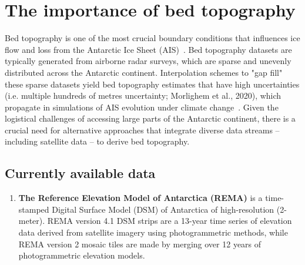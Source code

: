 

\section*{The importance of bed topography}
Bed topography is one of the most crucial boundary conditions that influences ice flow and loss from the Antarctic Ice Sheet (AIS)~\cite{Morlighem_2020}. Bed topography datasets are typically generated from airborne radar surveys, which are sparse and unevenly distributed across the Antarctic continent. Interpolation schemes to "gap fill" these sparse datasets yield bed topography estimates that have high uncertainties (i.e. multiple hundreds of metres uncertainty; Morlighem et al., 2020), which propagate in simulations of AIS evolution under climate change~\cite{Castleman_2022}. Given the logistical challenges of accessing large parts of the Antarctic continent, there is a crucial need for alternative approaches that integrate diverse data streams – including satellite data – to derive bed topography.

\subsection*{Currently available data}\label{data}
\begin{enumerate}
\item \textbf{The Reference Elevation Model of Antarctica (REMA)} is a time-stamped Digital Surface Model (DSM) of Antarctica of high-resolution (2-meter). REMA version 4.1 DSM strips are a 13-year time series of elevation data derived from satellite imagery using photogrammetric methods\cite{strips_2022}, while REMA version 2 mosaic tiles are made by merging over 12 years of photogrammetric elevation models\cite{mosaics_2022}. 
\end{enumerate}


